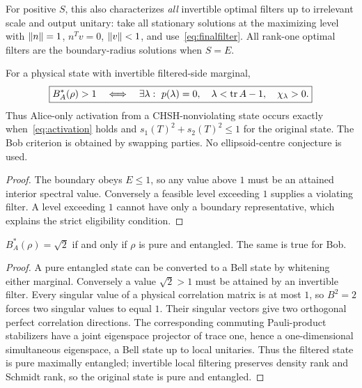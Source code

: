 For positive $S$, this also characterizes \emph{all} invertible optimal filters up to irrelevant scale and output unitary: take all stationary solutions at the maximizing level with $\left\lVert n\right\rVert=1$, $n^Tv=0$, $\left\lVert v\right\rVert<1$, and use~\eqref{eq:finalfilter}. All rank-one optimal filters are the boundary-radius solutions when $S=E$.

\begin{corollary}
For a physical state with invertible filtered-side marginal,
\begin{equation}
 \boxed{B_A^*(\rho)>1\quad\Longleftrightarrow\quad
 \exists\lambda:\ p(\lambda)=0,\quad
 \lambda<\operatorname{tr} A-1,\quad\chi_\lambda>0.}
 \label{eq:activation}
\end{equation}
Thus Alice-only activation from a CHSH-nonviolating state occurs exactly when~\eqref{eq:activation} holds and $s_1(T)^2+s_2(T)^2\le1$ for the original state. The Bob criterion is obtained by swapping parties. No ellipsoid-centre conjecture is used.
\end{corollary}
\begin{proof}
The boundary obeys $E\le1$, so any value above $1$ must be an attained interior spectral value. Conversely a feasible level exceeding $1$ supplies a violating filter. A level exceeding $1$ cannot have only a boundary representative, which explains the strict eligibility condition.
\end{proof}

\begin{corollary}
$B_A^*(\rho)=\sqrt2$ if and only if $\rho$ is pure and entangled. The same is true for Bob.
\end{corollary}
\begin{proof}
A pure entangled state can be converted to a Bell state by whitening either marginal. Conversely a value $\sqrt2>1$ must be attained by an invertible filter. Every singular value of a physical correlation matrix is at most $1$, so $B^2=2$ forces two singular values to equal $1$. Their singular vectors give two orthogonal perfect correlation directions. The corresponding commuting Pauli-product stabilizers have a joint eigenspace projector of trace one, hence a one-dimensional simultaneous eigenspace, a Bell state up to local unitaries. Thus the filtered state is pure maximally entangled; invertible local filtering preserves density rank and Schmidt rank, so the original state is pure and entangled.
\end{proof}


